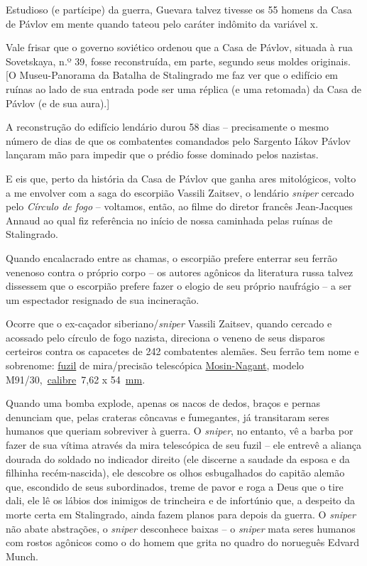 Estudioso (e partícipe) da guerra, Guevara talvez tivesse os 55 homens
da Casa de Pávlov em mente quando tateou pelo caráter indômito da
variável x.

Vale frisar que o governo soviético ordenou que a Casa de Pávlov,
situada à rua Sovetskaya, n.º 39, fosse reconstruída, em parte, segundo
seus moldes originais. {[}O Museu-Panorama da Batalha de Stalingrado me
faz ver que o edifício em ruínas ao lado de sua entrada pode ser uma
réplica (e uma retomada) da Casa de Pávlov (e de sua aura).{]}

A reconstrução do edifício lendário durou 58 dias -- precisamente o
mesmo número de dias de que os combatentes comandados pelo Sargento
Iákov Pávlov lançaram mão para impedir que o prédio fosse dominado pelos
nazistas.

E eis que, perto da história da Casa de Pávlov que ganha ares
mitológicos, volto a me envolver com a saga do escorpião Vassili
Zaitsev, o lendário \emph{sniper} cercado pelo \emph{Círculo de fogo} --
voltamos, então, ao filme do diretor francês Jean-Jacques Annaud ao qual
fiz referência no início de nossa caminhada pelas ruínas de Stalingrado.

Quando encalacrado entre as chamas, o escorpião prefere enterrar seu
ferrão venenoso contra o próprio corpo -- os autores agônicos da
literatura russa talvez dissessem que o escorpião prefere fazer o elogio
de seu próprio naufrágio -- a ser um espectador resignado de sua
incineração.

Ocorre que o ex-caçador siberiano/\emph{sniper} Vassili Zaitsev, quando
cercado e acossado pelo círculo de fogo nazista, direciona o veneno de
seus disparos certeiros contra os capacetes de 242 combatentes alemães.
Seu ferrão tem nome e sobrenome:
\href{https://pt.wikipedia.org/wiki/Fuzil}{fuzil} de mira/precisão
telescópica
\href{https://pt.wikipedia.org/wiki/Mosin-Nagant}{Mosin-Nagant}, modelo
M91/30,~\href{https://pt.wikipedia.org/wiki/Calibre}{calibre}~7,62 x
54~\href{https://pt.wikipedia.org/wiki/Mm}{mm}.

Quando uma bomba explode, apenas os nacos de dedos, braços e pernas
denunciam que, pelas crateras côncavas e fumegantes, já transitaram
seres humanos que queriam sobreviver à guerra. O \emph{sniper}, no
entanto, vê a barba por fazer de sua vítima através da mira telescópica
de seu fuzil -- ele entrevê a aliança dourada do soldado no indicador
direito (ele discerne a saudade da esposa e da filhinha recém-nascida),
ele descobre os olhos esbugalhados do capitão alemão que, escondido de
seus subordinados, treme de pavor e roga a Deus que o tire dali, ele lê
os lábios dos inimigos de trincheira e de infortúnio que, a despeito da
morte certa em Stalingrado, ainda fazem planos para depois da guerra. O
\emph{sniper} não abate abstrações, o \emph{sniper} desconhece baixas --
o \emph{sniper} mata seres humanos com rostos agônicos como o do homem
que grita no quadro do norueguês Edvard Munch.

